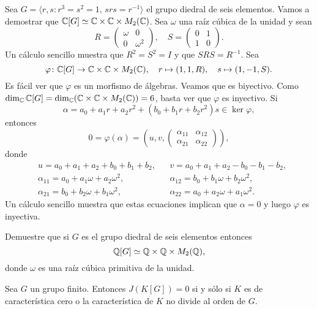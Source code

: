 \begin{example}
	Sea $G=\langle r,s:r^3=s^2=1,\,srs=r^{-1}\rangle$ el grupo diedral de seis
	elementos. Vamos a demostrar que $\mathbb{C}[G]\simeq\mathbb{C}\times\mathbb{C}\times M_2(\mathbb{C})$.  
	Sea $\omega$ una raíz cúbica de la unidad y sean  
	\[
		R=\begin{pmatrix}
			\omega & 0\\
			0 & \omega^2
		\end{pmatrix},
		\quad
		S=\begin{pmatrix}
			0 & 1\\
			1 & 0
		\end{pmatrix}.
	\]
	Un cálculo sencillo muestra que $R^2=S^2=I$ y que $SRS=R^{-1}$. Sea
	\[
		\varphi\colon\mathbb{C}[G]\to\mathbb{C}\times\mathbb{C}\times M_2(\mathbb{C}),\quad
		r\mapsto (1,1,R),\quad
		s\mapsto (1,-1,S).
	\]
	Es fácil ver que $\varphi$ es un morfismo de álgebras. Veamos que es
	biyectivo. Como $\dim_{\mathbb{C}}\mathbb{C}[G]=\dim_{\mathbb{C}}(\mathbb{C}\times\mathbb{C}\times M_2(\mathbb{C}))=6$,
	basta ver que $\varphi$ es inyectivo. Si 
	\[
		\alpha=a_0+a_1r+a_2r^2+(b_0+b_1r+b_2r^2)s\in\ker\varphi,
	\]
	entonces 
	\[
		0=\varphi(\alpha)=\left(u,v,\begin{pmatrix} \alpha_{11} & \alpha_{12}\\\alpha_{21}&\alpha_{22}\end{pmatrix}\right), 
	\]
	donde
	\begin{align*}
		&u = a_0+a_1+a_2+b_0+b_1+b_2, && v = a_0+a_1+a_2-b_0-b_1-b_2,\\
		&\alpha_{11}=a_0+a_1\omega+a_2\omega^2, && \alpha_{12}=b_0+b_1\omega+b_2\omega^2,\\
		&\alpha_{21}=b_0+b_2\omega+b_1\omega^2, && \alpha_{22}=a_0+a_2\omega+a_1\omega^2.
	\end{align*}
	Un cálculo sencillo muestra que estas ecuaciones implican que
	$\alpha=0$ y luego $\varphi$ es inyectiva.  
\end{example}

\begin{exercise}
	Demuestre que si $G$ es el grupo diedral de seis elementos entonces
	\[
		\mathbb{Q}[G]\simeq\mathbb{Q}\times\mathbb{Q}\times M_2(\mathbb{Q}),
	\]
	donde $\omega$ es una raíz cúbica primitiva de la unidad.
\end{exercise}

\begin{theorem}[Maschke]
	Sea $G$ un grupo finito. Entonces $J(K[G])=0$ si y sólo si $K$ es de
	característica cero o la característica de $K$ no divide al orden de $G$.
\end{theorem}

